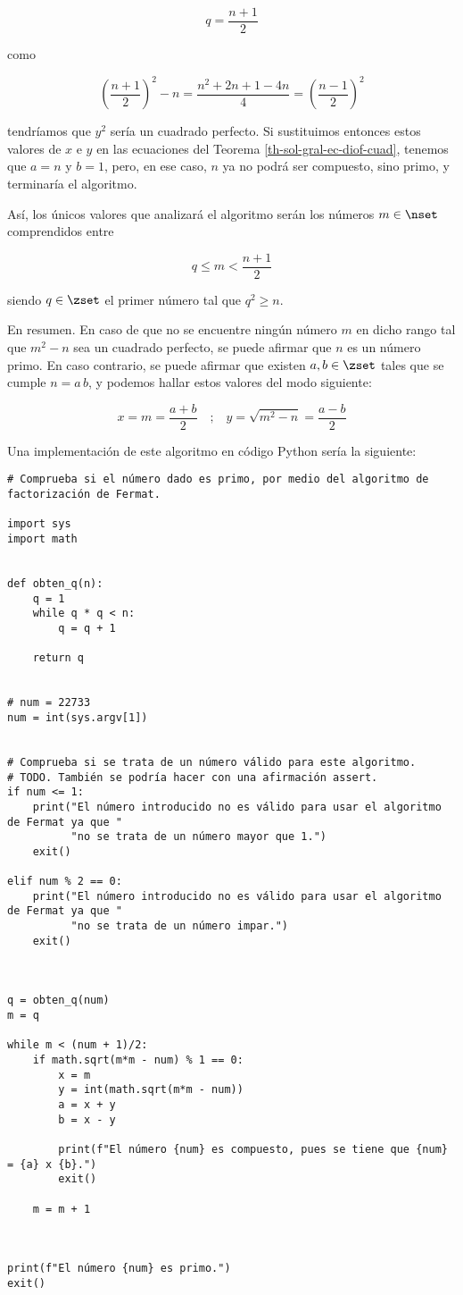 $$ q = \frac{n + 1}{2} $$

\noindent como

$$ \left( \frac{n + 1}{2} \right)^2 - n = \frac{n^2 + 2n + 1 - 4n}{4} =
\left( \frac{n - 1}{2} \right)^2 $$

\noindent tendríamos que $y^2$ sería un cuadrado perfecto. Si sustituimos
entonces estos valores de $x$ e $y$ en las ecuaciones del Teorema
\ref{th-sol-gral-ec-diof-cuad}, tenemos que $a = n$ y $b = 1$, pero, en ese
caso, $n$ ya no podrá ser compuesto, sino primo, y terminaría el algoritmo.

Así, los únicos valores que analizará el algoritmo serán los números $m \in
\nset$ comprendidos entre

$$ q \leq m < \frac{n + 1}{2} $$

\noindent siendo $q \in \zset$ el primer número tal que $q^2 \geq n$.

En resumen. En caso de que no se encuentre ningún número $m$ en dicho rango
tal que $m^2 - n$ sea un cuadrado perfecto, se puede afirmar que $n$ es un
número primo. En caso contrario, se puede afirmar que existen $a, b \in
\zset$ tales que se cumple $n = a \, b$, y podemos hallar estos valores del
modo siguiente:

$$ x = m = \frac{a + b}{2} \quad \text{;} \quad y = \sqrt{m^2 - n} = \frac{a
- b}{2} $$


Una implementación de este algoritmo en código Python sería la siguiente:

\begin{verbatim}
# Comprueba si el número dado es primo, por medio del algoritmo de factorización de Fermat.

import sys
import math


def obten_q(n):
    q = 1
    while q * q < n:
        q = q + 1

    return q


# num = 22733
num = int(sys.argv[1])


# Comprueba si se trata de un número válido para este algoritmo.
# TODO. También se podría hacer con una afirmación assert.
if num <= 1:
    print("El número introducido no es válido para usar el algoritmo de Fermat ya que "
          "no se trata de un número mayor que 1.")
    exit()

elif num % 2 == 0:
    print("El número introducido no es válido para usar el algoritmo de Fermat ya que "
          "no se trata de un número impar.")
    exit()



q = obten_q(num)
m = q

while m < (num + 1)/2:
    if math.sqrt(m*m - num) % 1 == 0:
        x = m
        y = int(math.sqrt(m*m - num))
        a = x + y
        b = x - y

        print(f"El número {num} es compuesto, pues se tiene que {num} = {a} x {b}.")
        exit()

    m = m + 1



print(f"El número {num} es primo.")
exit()
\end{verbatim}
